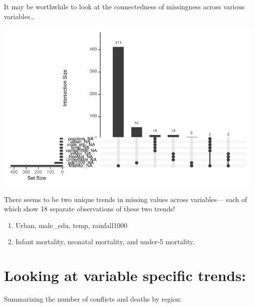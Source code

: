 \documentclass[
  letterpaper,
  DIV=11,
  numbers=noendperiod]{scrartcl}
\providecommand{\tightlist}{%
  \setlength{\itemsep}{0pt}\setlength{\parskip}{0pt}}\usepackage{longtable,booktabs,array}
\begin{document}
It may be worthwhile to look at the connectedness of missingness across
various variables\ldots{}

\includegraphics{MortalityDescriptives_files/figure-pdf/unnamed-chunk-11-1.pdf}

There seems to be two unique trends in missing values across
variables--- each of which show 18 separate observations of these two
trends!

\begin{enumerate}
\def\labelenumi{\arabic{enumi}.}
\tightlist
\item
  Urban, male\_edu, temp, rainfall1000
\item
  Infant mortality, neonatal mortality, and under-5 mortality.
\end{enumerate}

\section{Looking at variable specific
trends:}\label{looking-at-variable-specific-trends}

Summarizing the number of conflicts and deaths by region:
\end{document}
